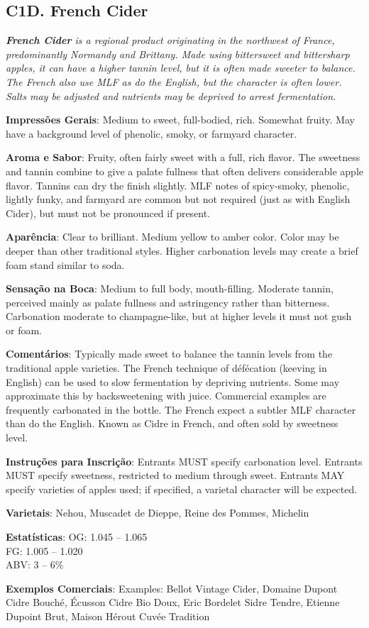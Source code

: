 \subsection*{C1D. French Cider}

\textit{\textbf{French Cider} is a regional product originating in the northwest of France, predominantly Normandy and Brittany. Made using bittersweet and bittersharp apples, it can have a higher tannin level, but it is often made sweeter to balance. The French also use MLF as do the English, but the character is often lower. Salts may be adjusted and nutrients may be deprived to arrest fermentation.}

\textbf{Impressões Gerais}: Medium to sweet, full-bodied, rich. Somewhat fruity. May have a background level of phenolic, smoky, or farmyard character.

\textbf{Aroma e Sabor}: Fruity, often fairly sweet with a full, rich flavor. The sweetness and tannin combine to give a palate fullness that often delivers considerable apple flavor. Tannins can dry the finish slightly. MLF notes of spicy-smoky, phenolic, lightly funky, and farmyard are common but not required (just as with English Cider), but must not be pronounced if present.

\textbf{Aparência}: Clear to brilliant. Medium yellow to amber color. Color may be deeper than other traditional styles. Higher carbonation levels may create a brief foam stand similar to soda.

\textbf{Sensação na Boca}: Medium to full body, mouth-filling. Moderate tannin, perceived mainly as palate fullness and astringency rather than bitterness. Carbonation moderate to champagne-like, but at higher levels it must not gush or foam.

\textbf{Comentários}: Typically made sweet to balance the tannin levels from the traditional apple varieties. The French technique of défécation (keeving in English) can be used to slow fermentation by depriving nutrients. Some may approximate this by backsweetening with juice. Commercial examples are frequently carbonated in the bottle. The French expect a subtler MLF character than do the English. Known as Cidre in French, and often sold by sweetness level.

\textbf{Instruções para Inscrição}: Entrants MUST specify carbonation level. Entrants MUST specify sweetness, restricted to medium through sweet. Entrants MAY specify varieties of apples used; if specified, a varietal character will be expected.

\textbf{Varietais}: Nehou, Muscadet de Dieppe, Reine des Pommes, Michelin

\textbf{Estatísticas}: OG: 1.045 – 1.065 \\
\phantom{ } \hspace{16.5mm} FG: 1.005 – 1.020 \\
\phantom{ } \hspace{16.5mm} ABV: 3 – 6\%

\textbf{Exemplos Comerciais}: Examples: Bellot Vintage Cider, Domaine Dupont Cidre Bouché, Écusson Cidre Bio Doux, Eric Bordelet Sidre Tendre, Etienne Dupoint Brut, Maison Hérout Cuvée Tradition